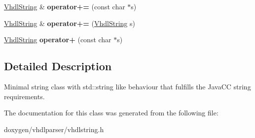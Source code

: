 \begin{DoxyCompactItemize}
\mbox{\hyperlink{class_vhdl_string}{Vhdl\+String}} \& {\bfseries operator+=} (const char $\ast$s)
\item 
\mbox{\label{class_vhdl_string_a4849c6512040654bca98e05cf2a39178}} 
\mbox{\hyperlink{class_vhdl_string}{Vhdl\+String}} \& {\bfseries operator+=} (\mbox{\hyperlink{class_vhdl_string}{Vhdl\+String}} s)
\item 
\mbox{\label{class_vhdl_string_a659e399322549ea7fba70bdb338a0855}} 
\mbox{\hyperlink{class_vhdl_string}{Vhdl\+String}} {\bfseries operator+} (const char $\ast$s)
\end{DoxyCompactItemize}


\subsection{Detailed Description}
Minimal string class with std\+::string like behaviour that fulfills the Java\+CC string requirements. 

The documentation for this class was generated from the following file\+:\begin{DoxyCompactItemize}
\item 
doxygen/vhdlparser/vhdlstring.\+h\end{DoxyCompactItemize}
